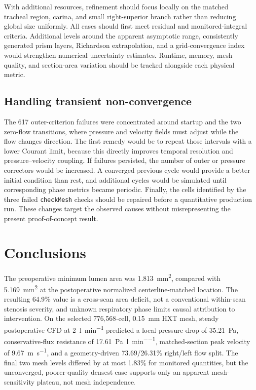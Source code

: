 \documentclass[11pt,a4paper]{article}
\begin{document}
With additional resources, refinement should focus locally on the matched
tracheal region, carina, and small right-superior branch rather than reducing
global size uniformly. All cases should first meet residual and monitored-integral
criteria. Additional levels around the apparent asymptotic range, consistently
generated prism layers, Richardson extrapolation, and a grid-convergence index
would strengthen numerical uncertainty estimates. Runtime, memory, mesh quality,
and section-area variation should be tracked alongside each physical metric.

\subsection{Handling transient non-convergence}

The 617 outer-criterion failures were concentrated around startup and the two
zero-flow transitions, where pressure and velocity fields must adjust while the
flow changes direction. The first remedy would be to repeat those intervals with
a lower Courant limit, because this directly improves temporal resolution and
pressure--velocity coupling. If failures persisted, the number of outer or
pressure correctors would be increased. A converged previous cycle would provide
a better initial condition than rest, and additional cycles would be simulated
until corresponding phase metrics became periodic. Finally, the cells identified
by the three failed \texttt{checkMesh} checks should be repaired before a
quantitative production run. These changes target the observed causes without
misrepresenting the present proof-of-concept result.

\section{Conclusions}
\label{sec:conclusions}

The preoperative minimum lumen area was \SI{1.813}{\milli\metre\squared},
compared with \SI{5.169}{\milli\metre\squared} at the postoperative normalized
centerline-matched location. The resulting 64.9\% value is a cross-scan area
deficit, not a conventional within-scan stenosis severity, and unknown respiratory
phase limits causal attribution to intervention. On the selected 776,568-cell,
\num{0.15}~mm HXT mesh, steady postoperative CFD at
\SI{2}{\litre\per\minute} predicted a local pressure drop of
\SI{35.21}{\pascal}, conservative-flux resistance of
\SI{17.61}{\pascal\per\litre\per\minute}, matched-section peak velocity of
\SI{9.67}{\metre\per\second}, and a geometry-driven 73.69/26.31\% right/left
flow split. The final two mesh levels differed by at most 1.83\% for monitored
quantities, but the unconverged, poorer-quality densest case supports only an
apparent mesh-sensitivity plateau, not mesh independence.
\end{document}
